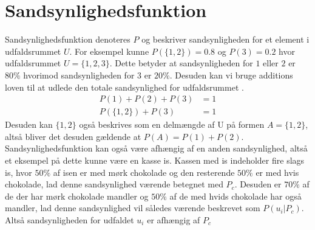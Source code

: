 \documentclass[../../SRP.tex]{subfiles}
\begin{document}
\begin{center}
\qquad
\end{center}
\section{Sandsynlighedsfunktion}

Sandsynlighedsfunktion denoteres $P$ og beskriver sandsynligheden for et element i udfaldsrummet $U$. For eksempel kunne $P(\{1,2\}) = 0.8$ og $P(3) = 0.2$ hvor udfaldsrummet $U = \{1,2,3\}$. Dette betyder at sandsynligheden for $1$ eller $2$ er $80\%$ hvorimod sandsynligheden for $3$ er $20\%$. Desuden kan vi bruge additions loven til at udlede den totale sandsynlighed for udfaldsrummet \cite{SC}.
\begin{align}
  P(1) + P(2) + P(3) &= 1 \\
  P(\{1,2\}) + P(3) &= 1
\end{align}
Desuden kan $\{1,2\}$ også beskrives som en delmængde af U på formen $A = \{1,2\}$, altså bliver det desuden gældende at $P(A) = P(1) + P(2)$. \\

Sandsynlighedsfunktion kan også være afhængig af en anden sandsynlighed, altså et eksempel på dette kunne være en kasse is. Kassen med is indeholder fire slags is, hvor $50\%$ af isen er med mørk chokolade og den resterende $50\%$ er med hvis chokolade, lad denne sandsynlighed værende betegnet med $P_c$. Desuden er $70\%$ af de der har mørk chokolade mandler og $50\%$ af de med hvids chokolade har også mandler, lad denne sandsynlighed vil således værende beskrevet som $P(u_i | P_c)$. Altså sandsynligheden for udfaldet $u_i$ er afhængig af $P_c$ 
\end{document}
